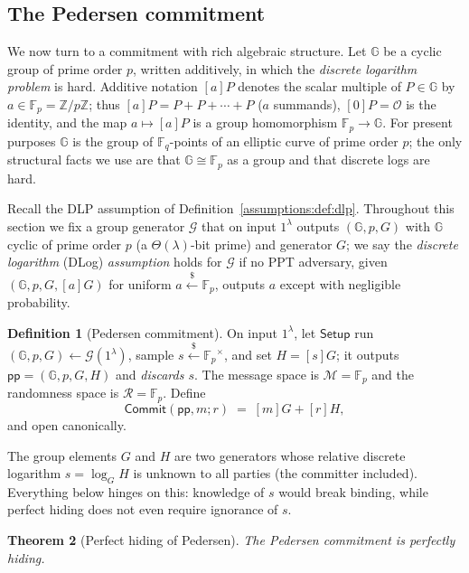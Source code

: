 \documentclass[11pt,a4paper]{article}
\newtheorem{theorem}{Theorem}[section]
\theoremstyle{definition}
\newtheorem{definition}[theorem]{Definition}
\theoremstyle{remark}
\newcommand{\Z}{\ensuremath{\mathbb{Z}}}
\newcommand{\G}{\ensuremath{\mathbb{G}}}
\newcommand{\Fp}{\ensuremath{\mathbb{F}_{p}}}
\newcommand{\Fq}{\ensuremath{\mathbb{F}_{q}}}
\begin{document}
\subsection{The Pedersen commitment}\label{commitments:subsec:pedersen}

We now turn to a commitment with rich algebraic structure. Let \(\G\) be a cyclic group of prime order \(p\), written additively, in which the \emph{discrete logarithm problem} is hard. Additive notation \([a]P\) denotes the scalar multiple of \(P \in \G\) by \(a \in \Fp = \Z/p\Z\); thus \([a]P = P + P + \cdots + P\) (\(a\) summands), \([0]P = \mathcal{O}\) is the identity, and the map \(a \mapsto [a]P\) is a group homomorphism \(\Fp \to \G\). For present purposes \(\G\) is the group of \(\Fq\)-points of an elliptic curve of prime order \(p\); the only structural facts we use are that \(\G \cong \Fp\) as a group and that discrete logs are hard.

Recall the DLP assumption of Definition~\ref{assumptions:def:dlp}. Throughout this section we fix a group generator \(\mathcal{G}\) that on input \(1^\lambda\) outputs \((\G, p, G)\) with \(\G\) cyclic of prime order \(p\) (a \(\Theta(\lambda)\)-bit prime) and generator \(G\); we say the \emph{discrete logarithm} (DLog) \emph{assumption} holds for \(\mathcal{G}\) if no PPT adversary, given \((\G, p, G, [a]G)\) for uniform \(a \xleftarrow{\$} \Fp\), outputs \(a\) except with negligible probability.

\begin{definition}[Pedersen commitment]\label{commitments:def:pedersen}
On input \(1^\lambda\), let \(\mathsf{Setup}\) run \((\G, p, G) \gets \mathcal{G}(1^\lambda)\), sample \(s \xleftarrow{\$} \Fp^\times\), and set \(H = [s]G\); it outputs \(\mathsf{pp} = (\G, p, G, H)\) and \emph{discards \(s\)}. The message space is \(\mathcal{M} = \Fp\) and the randomness space is \(\mathcal{R} = \Fp\). Define
\[
  \mathsf{Commit}(\mathsf{pp}, m; r) \;=\; [m]G + [r]H,
\]
and open canonically.
\end{definition}

The group elements \(G\) and \(H\) are two generators whose relative discrete logarithm \(s = \log_G H\) is unknown to all parties (the committer included). Everything below hinges on this: knowledge of \(s\) would break binding, while perfect hiding does not even require ignorance of \(s\).

\begin{theorem}[Perfect hiding of Pedersen]\label{commitments:thm:pedersen-hiding}
The Pedersen commitment is perfectly hiding.
\end{theorem}
\end{document}

